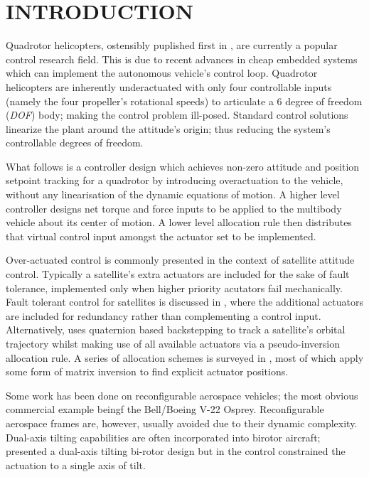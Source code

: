 \documentclass[a4paper, 10pt, conference]{ieeeconf}
\begin{document}
\section{INTRODUCTION}
Quadrotor helicopters, ostensibly puplished first in \cite{x4flyer}, are currently a popular control research field. This is due to recent advances in cheap embedded systems which can implement the autonomous vehicle's control loop. Quadrotor helicopters are inherently underactuated with only four controllable inputs (namely the four propeller's rotational speeds) to articulate a 6 degree of freedom (\emph{DOF}) body; making the control problem ill-posed. Standard control solutions linearize the plant around the attitude's origin; thus reducing the system's controllable degrees of freedom. 
\par
What follows is a controller design which achieves non-zero attitude and position setpoint tracking for a quadrotor by introducing overactuation to the vehicle, without any linearisation of the dynamic equations of motion. A higher level controller designs net torque and force inputs to be applied to the multibody vehicle about its center of motion. A lower level allocation rule then distributes that virtual control input amongst the actuator set to be implemented.
\par
Over-actuated control is commonly presented in the context of satellite attitude control. Typically a satellite's extra actuators are included for the sake of fault tolerance, implemented only when higher priority acutators fail mechanically. Fault tolerant control for satellites is discussed in \cite{ftcallocation}, where the additional actuators are included for redundancy rather than complementing a control input. Alternatively, \cite{quaternionbackstep} uses quaternion based backstepping to track a satellite's orbital trajectory whilst making use of all available actuators via a pseudo-inversion allocation rule. A series of allocation schemes is surveyed in \cite{allocation}, most of which apply some form of matrix inversion to find explicit actuator positions.
\par
Some work has been done on reconfigurable aerospace vehicles; the most obvious commercial example beingf the Bell/Boeing V-22 Osprey. Reconfigurable aerospace frames are, however, usually avoided due to their dynamic complexity. Dual-axis tilting capabilities are often incorporated into birotor aircraft; \cite{ggress} presented a dual-axis tilting bi-rotor design but in the control constrained the actuation to a single axis of tilt. 
\end{document}
